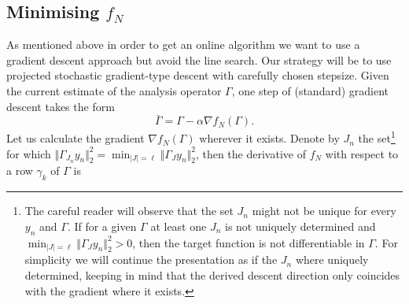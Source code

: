 \documentclass[11pt, onecolumn, journal,compsoc]{IEEEtran}
\newcommand\bGamma{\bar\Gamma}
\theoremstyle{plain}
\theoremstyle{remark}
\begin{document}
\subsection{Minimising $f_N$}

As mentioned above in order to get an online algorithm we want to use a gradient descent approach but avoid the line search. Our strategy will be to use projected stochastic gradient-type descent with carefully chosen stepsize. Given the current estimate of the analysis operator $\Gamma$, one step of (standard) gradient descent takes the form 
\[\bGamma= \Gamma- \alpha \nabla f_N\left(\Gamma \right).\]
Let us calculate the gradient $\nabla f_N\left(\Gamma \right)$ wherever it exists.
Denote by $J_n$ the set\footnote{The careful reader will observe that the set $J_n$ might not be unique for every $y_n$ and $\Gamma$. If for a given $\Gamma$ at least one $J_n$ is not uniquely determined and $\min_{|J| = \ell} \Vert \Gamma_J y_n \Vert_2^2>0$, then the target function is not differentiable in $\Gamma$. For simplicity we will continue the presentation as if the $J_n$ where uniquely determined, keeping in mind that the derived descent direction only coincides with the gradient where it exists.} for which $\Vert \Gamma_{J_n} y_n\Vert_2^2 = \min_{|J| = \ell} \Vert \Gamma_J y_n \Vert_2^2$, then the derivative of $f_N$ with respect to a row $\gamma_k$ of $\Gamma$ is
\end{document}

